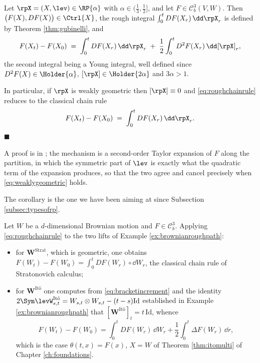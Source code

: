 \begin{proposition}\label{prop:roughchainrule}
Let $\rpX = (X,\lev) \in \RP{\alpha}$ with $\alpha\in(\tfrac13,\tfrac12]$, and let
$F \in \mathcal{C}^3_b(V,W)$. Then $\bigl(F(X), DF(X)\bigr) \in \Ctrl{X}$, the rough integral
$\int_0^t DF(X_r)\,\dd\rpX_r$ is defined by Theorem \ref{thm:gubinelli}, and
\begin{equation}\label{eq:roughchainrule}
F(X_t) - F(X_0) \;=\; \int_0^t DF(X_r)\,\dd\rpX_r \;+\; \frac12\int_0^t D^2F(X_r)\,\dd[\rpX]_r ,
\end{equation}
the second integral being a Young integral, well defined since $D^2F(X)\in\Holder{\alpha}$,
$[\rpX]\in\Holder{2\alpha}$ and $3\alpha>1$.

In particular, if $\rpX$ is weakly geometric then $[\rpX]\equiv0$ and \eqref{eq:roughchainrule}
reduces to the classical chain rule
\begin{equation}\label{eq:classicalchainrule}
F(X_t) - F(X_0) \;=\; \int_0^t DF(X_r)\,\dd\rpX_r .
\end{equation}
\hfill $\blacksquare$
\end{proposition}

A proof is in \cite[Ch.\ 7]{frizhairer2020}; the mechanism is a second-order Taylor expansion of
$F$ along the partition, in which the symmetric part of $\lev$ is exactly what the quadratic term
of the expansion produces, so that the two agree and cancel precisely when
\eqref{eq:weaklygeometric} holds.

The corollary is the one we have been aiming at since Subsection \ref{subsec:typesofrp}.

\begin{corollary}[It\^o's formula]\label{cor:itoformula}
Let $W$ be a $d$-dimensional Brownian motion and $F\in\mathcal{C}^3_b$. Applying
\eqref{eq:roughchainrule} to the two lifts of Example \ref{ex:brownianroughpath}:
\begin{itemize}
    \item[i)] for $\mathbf{W}^{\mathrm{Strat}}$, which is geometric, one obtains
    $F(W_t)-F(W_0) = \int_0^t DF(W_r)\circ\dd W_r$, the classical chain rule of Stratonovich
    calculus;
    \item[ii)] for $\mathbf{W}^{\mathrm{It\hat o}}$ one computes from \eqref{eq:bracketincrement}
    and the identity $2\Sym\levW^{\mathrm{It\hat o}}_{s,t} = W_{s,t}\otimes W_{s,t} - (t-s)\mathrm{Id}$
    established in Example \ref{ex:brownianroughpath} that
    $[\mathbf{W}^{\mathrm{It\hat o}}]_t = t\,\mathrm{Id}$, whence
    \begin{equation}\label{eq:itofromrough}
    F(W_t)-F(W_0) = \int_0^t DF(W_r)\,\dd W_r + \frac12\int_0^t \Delta F(W_r)\,\dd r ,
    \end{equation}
    which is the case $\theta(t,x) = F(x)$, $X = W$ of Theorem \ref{thm:itomulti} of Chapter
    \ref{ch:foundations}.
\end{itemize}
\end{corollary}

